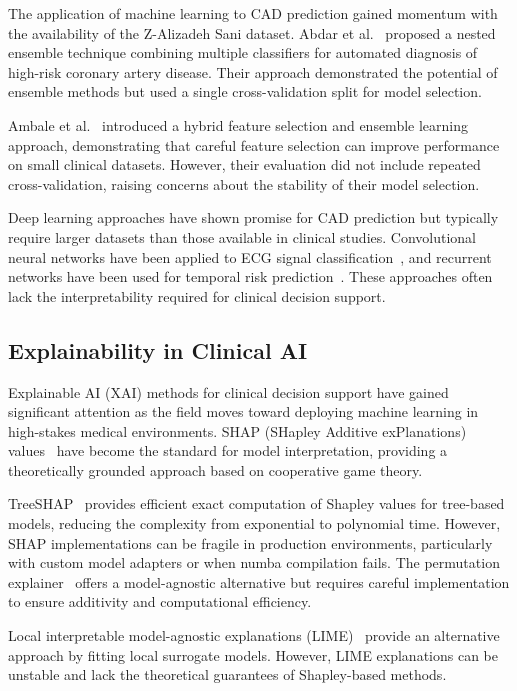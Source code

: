 \documentclass[conference]{IEEEtran}
\begin{document}
The application of machine learning to CAD prediction gained momentum with the availability of the Z-Alizadeh Sani dataset. Abdar et al.~\cite{abdar2019} proposed a nested ensemble technique combining multiple classifiers for automated diagnosis of high-risk coronary artery disease. Their approach demonstrated the potential of ensemble methods but used a single cross-validation split for model selection.

Ambale et al.~\cite{ambale2017} introduced a hybrid feature selection and ensemble learning approach, demonstrating that careful feature selection can improve performance on small clinical datasets. However, their evaluation did not include repeated cross-validation, raising concerns about the stability of their model selection.

Deep learning approaches have shown promise for CAD prediction but typically require larger datasets than those available in clinical studies. Convolutional neural networks have been applied to ECG signal classification~\cite{acharya2017}, and recurrent networks have been used for temporal risk prediction~\cite{choi2016}. These approaches often lack the interpretability required for clinical decision support.

\subsection{Explainability in Clinical AI}

Explainable AI (XAI) methods for clinical decision support have gained significant attention as the field moves toward deploying machine learning in high-stakes medical environments. SHAP (SHapley Additive exPlanations) values~\cite{lundberg2017} have become the standard for model interpretation, providing a theoretically grounded approach based on cooperative game theory.

TreeSHAP~\cite{lundberg2018} provides efficient exact computation of Shapley values for tree-based models, reducing the complexity from exponential to polynomial time. However, SHAP implementations can be fragile in production environments, particularly with custom model adapters or when numba compilation fails. The permutation explainer~\cite{lundberg2017} offers a model-agnostic alternative but requires careful implementation to ensure additivity and computational efficiency.

Local interpretable model-agnostic explanations (LIME)~\cite{ribeiro2016} provide an alternative approach by fitting local surrogate models. However, LIME explanations can be unstable and lack the theoretical guarantees of Shapley-based methods.
\end{document}
